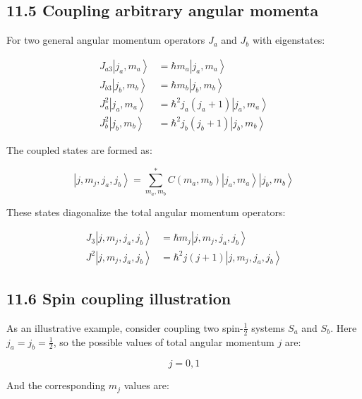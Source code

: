 \documentclass[10pt]{article}
\begin{document}
\subsection*{11.5 Coupling arbitrary angular momenta}
For two general angular momentum operators $J_{a}$ and $J_{b}$ with eigenstates:

\begin{align*}
J_{a3}\left|j_{a}, m_{a}\right\rangle &= \hbar m_{a}\left|j_{a}, m_{a}\right\rangle \\
J_{b3}\left|j_{b}, m_{b}\right\rangle &= \hbar m_{b}\left|j_{b}, m_{b}\right\rangle \\
J_{a}^{2}\left|j_{a}, m_{a}\right\rangle &= \hbar^2 j_{a}\left(j_{a}+1\right)\left|j_{a}, m_{a}\right\rangle  \tag{11.53}\\
J_{b}^{2}\left|j_{b}, m_{b}\right\rangle &= \hbar^{2} j_{b}\left(j_{b}+1\right)\left|j_{b}, m_{b}\right\rangle
\end{align*}

The coupled states are formed as:

\begin{equation*}
\left|j, m_{j}, j_{a}, j_{b}\right\rangle=\sum_{m_{a}, m_{b}}^{*} C\left(m_{a}, m_{b}\right)\left|j_{a}, m_{a}\right\rangle\left|j_{b}, m_{b}\right\rangle \tag{11.54}
\end{equation*}

These states diagonalize the total angular momentum operators:

\begin{align*}
J_{3}\left|j, m_{j}, j_{a}, j_{b}\right\rangle &= \hbar m_{j}\left|j, m_{j}, j_{a}, j_{b}\right\rangle \\
J^{2}\left|j, m_{j}, j_{a}, j_{b}\right\rangle &= \hbar^2 j(j+1)\left|j, m_{j}, j_{a}, j_{b}\right\rangle \tag{11.55}
\end{align*}

\subsection*{11.6 Spin coupling illustration}
As an illustrative example, consider coupling two spin-$\frac{1}{2}$ systems $S_{a}$ and $S_{b}$. Here $j_{a}=j_{b}=\frac{1}{2}$, so the possible values of total angular momentum $j$ are:

\begin{equation*}
j=0,1 \tag{11.56}
\end{equation*}

And the corresponding $m_j$ values are:
\end{document}
